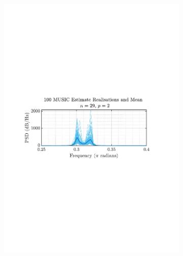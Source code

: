 \documentclass[12pt]{article}
\numberwithin{equation}{section}
\begin{document}
\begin{figure}[H]
\begin{subfigure}{0.49\textwidth}
			\includegraphics[trim={2.2cm 11cm 3.15cm  11.2cm}, clip, width=\textwidth]{../MATLAB/figures/q1_3e_fig03.pdf} 
		\end{subfigure}
		\begin{subfigure}{0.49\textwidth}
			\centering

\end{subfigure}
\end{figure}
\end{document}
